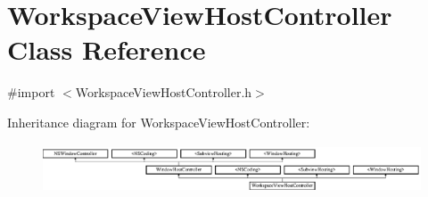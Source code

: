 \hypertarget{interface_workspace_view_host_controller}{\section{Workspace\-View\-Host\-Controller Class Reference}
\label{interface_workspace_view_host_controller}
}


{\ttfamily \#import $<$Workspace\-View\-Host\-Controller.\-h$>$}

Inheritance diagram for Workspace\-View\-Host\-Controller\-:\begin{figure}[H]
\begin{center}
\leavevmode
\includegraphics[height=1.458333cm]{interface_workspace_view_host_controller}
\end{center}
\end{figure}
